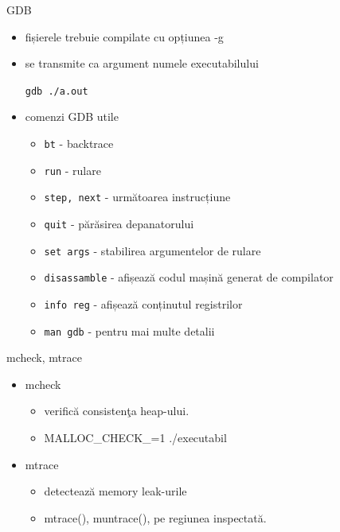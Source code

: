 \documentclass{so.cs.pub.ro}
\begin{document}
\begin{frame}{GDB}
  \begin{itemize}
    \item fișierele trebuie compilate cu opțiunea -g
    \item se transmite ca argument numele executabilului
      \begin{beamerboxesrounded}[lower=block body,shadow=true]{}
        \small{\texttt{gdb ./a.out}}
      \end{beamerboxesrounded}
    \item comenzi GDB utile
      \begin{itemize}
        \item \texttt{bt} - backtrace
        \item \texttt{run} - rulare
        \item \texttt{step, next} - următoarea instrucțiune
        \item \texttt{quit} - părăsirea depanatorului
        \item \texttt{set args} - stabilirea argumentelor de rulare
        \item \texttt{disassamble} - afișează codul mașină generat de compilator
        \item \texttt{info reg} - afișează conținutul registrilor
        \item \texttt{man gdb} - pentru mai multe detalii
      \end{itemize}
  \end{itemize}
\end{frame}

\begin{frame}{mcheck, mtrace}
  \begin{itemize}
    \item mcheck
      \begin{itemize}
			\item verifică consistenţa heap-ului.
			\item MALLOC_CHECK_=1 ./executabil
  		\end{itemize}
        \vspace*{0.4cm}
	 \item mtrace
	   \begin{itemize}
			\item detectează memory leak-urile
			\item mtrace(), muntrace(), pe regiunea inspectată.
  		\end{itemize}
  \end{itemize}
\end{frame}
\end{document}
